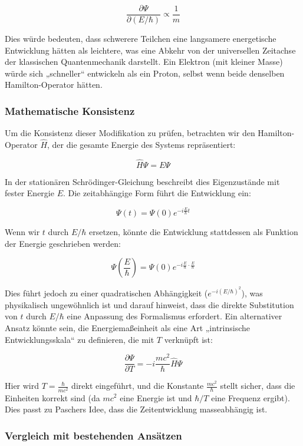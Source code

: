 \documentclass{article}
\begin{document}
	\[
	\frac{\partial \Psi}{\partial (E/\hbar)} \propto \frac{1}{m}
	\]
	
	Dies würde bedeuten, dass schwerere Teilchen eine langsamere energetische Entwicklung hätten als leichtere, was eine Abkehr von der universellen Zeitachse der klassischen Quantenmechanik darstellt. Ein Elektron (mit kleiner Masse) würde sich „schneller“ entwickeln als ein Proton, selbst wenn beide denselben Hamilton-Operator hätten.
	
	\subsubsection{Mathematische Konsistenz}
	
	Um die Konsistenz dieser Modifikation zu prüfen, betrachten wir den Hamilton-Operator \( \hat{H} \), der die gesamte Energie des Systems repräsentiert:
	
	\[
	\hat{H} \Psi = E \Psi
	\]
	
	In der stationären Schrödinger-Gleichung beschreibt dies Eigenzustände mit fester Energie \( E \). Die zeitabhängige Form führt die Entwicklung ein:
	
	\[
	\Psi(t) = \Psi(0) e^{-i \frac{E}{\hbar} t}
	\]
	
	Wenn wir \( t \) durch \( E/\hbar \) ersetzen, könnte die Entwicklung stattdessen als Funktion der Energie geschrieben werden:
	
	\[
	\Psi\left(\frac{E}{\hbar}\right) = \Psi(0) e^{-i \frac{E}{\hbar} \cdot \frac{E}{\hbar}}
	\]
	
	Dies führt jedoch zu einer quadratischen Abhängigkeit (\( e^{-i (E/\hbar)^2} \)), was physikalisch ungewöhnlich ist und darauf hinweist, dass die direkte Substitution von \( t \) durch \( E/\hbar \) eine Anpassung des Formalismus erfordert. Ein alternativer Ansatz könnte sein, die Energiemaßeinheit als eine Art „intrinsische Entwicklungsskala“ zu definieren, die mit \( T \) verknüpft ist:
	
	\[
	\frac{\partial \Psi}{\partial T} = -i \frac{mc^2}{\hbar} \hat{H} \Psi
	\]
	
	Hier wird \( T = \frac{\hbar}{mc^2} \) direkt eingeführt, und die Konstante \( \frac{mc^2}{\hbar} \) stellt sicher, dass die Einheiten korrekt sind (da \( mc^2 \) eine Energie ist und \( \hbar/T \) eine Frequenz ergibt). Dies passt zu Paschers Idee, dass die Zeitentwicklung masseabhängig ist.
	
	\subsubsection{Vergleich mit bestehenden Ansätzen}
	
\end{document}
